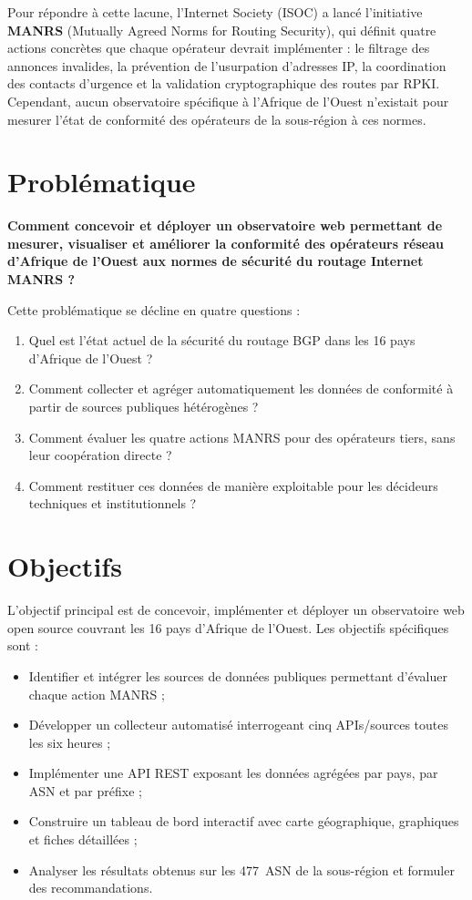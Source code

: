 \documentclass{eneam}
\begin{document}
Pour répondre à cette lacune, l'Internet Society (ISOC) a lancé l'initiative \textbf{MANRS} (Mutually Agreed Norms for Routing Security), qui définit quatre actions concrètes que chaque opérateur devrait implémenter : le filtrage des annonces invalides, la prévention de l'usurpation d'adresses IP, la coordination des contacts d'urgence et la validation cryptographique des routes par RPKI. Cependant, aucun observatoire spécifique à l'Afrique de l'Ouest n'existait pour mesurer l'état de conformité des opérateurs de la sous-région à ces normes.

\section{Problématique}

\textbf{Comment concevoir et déployer un observatoire web permettant de mesurer, visualiser et améliorer la conformité des opérateurs réseau d'Afrique de l'Ouest aux normes de sécurité du routage Internet MANRS ?}

Cette problématique se décline en quatre questions :
\begin{enumerate}
    \item Quel est l'état actuel de la sécurité du routage BGP dans les 16 pays d'Afrique de l'Ouest ?
    \item Comment collecter et agréger automatiquement les données de conformité à partir de sources publiques hétérogènes ?
    \item Comment évaluer les quatre actions MANRS pour des opérateurs tiers, sans leur coopération directe ?
    \item Comment restituer ces données de manière exploitable pour les décideurs techniques et institutionnels ?
\end{enumerate}

\section{Objectifs}

L'objectif principal est de concevoir, implémenter et déployer un observatoire web open source couvrant les 16 pays d'Afrique de l'Ouest. Les objectifs spécifiques sont :

\begin{itemize}
    \item Identifier et intégrer les sources de données publiques permettant d'évaluer chaque action MANRS ;
    \item Développer un collecteur automatisé interrogeant cinq APIs/sources toutes les six heures ;
    \item Implémenter une API REST exposant les données agrégées par pays, par ASN et par préfixe ;
    \item Construire un tableau de bord interactif avec carte géographique, graphiques et fiches détaillées ;
    \item Analyser les résultats obtenus sur les 477~ASN de la sous-région et formuler des recommandations.
\end{itemize}
\end{document}
